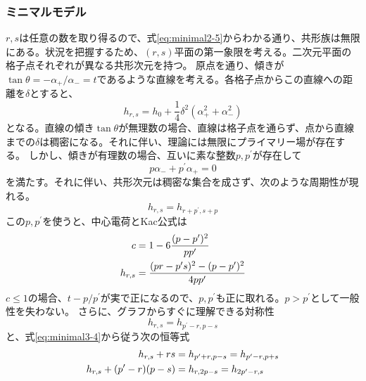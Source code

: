 \documentclass[11pt, aps, longbibliography]{article}
\numberwithin{equation}{section}
\begin{document}
        \subsubsection{ミニマルモデル}
        $r,s$は任意の数を取り得るので、式\eqref{eq:minimal2-5}からわかる通り、共形族は無限にある。状況を把握するため、$(r,s)$平面の第一象限を考える。二次元平面の格子点それぞれが異なる共形次元を持つ。
        原点を通り、傾きが$\tan \theta = -\alpha_+/\alpha_- = t$であるような直線を考える。各格子点からこの直線への距離を$\delta$とすると、
        \begin{equation}\label{eq:minimal3-1}
            h_{r,s} = h_0 + \frac{1}{4}\delta^2(\alpha_+^2 + \alpha_-^2)
        \end{equation}
        となる。直線の傾き$\tan \theta$が無理数の場合、直線は格子点を通らず、点から直線までの$\delta$は稠密になる。それに伴い、理論には無限にプライマリー場が存在する。
        しかし、傾きが有理数の場合、互いに素な整数$p,p^\prime$が存在して
        \begin{equation}\label{eq:minimal3-2}
            p\alpha_- + p^\prime \alpha_+ = 0
        \end{equation}
        を満たす。それに伴い、共形次元は稠密な集合を成さず、次のような周期性が現れる。
        \begin{equation}\label{eq:minimal3-3}
            h_{r,s} = h_{r+p^\prime, s+p}
        \end{equation}
        この$p,p^\prime$を使うと、中心電荷とKac公式は
        \begin{align}\label{eq:minimal3-4}
            c &= 1-6\frac{(p-p^\prime)^2}{pp^\prime} \\
            h_{r,s} &= \frac{(pr-p^\prime s)^2-(p-p^\prime)^2}{4pp^\prime} \notag 
        \end{align}
        $c\leq 1$の場合、$t-p/p^\prime$が実で正になるので、$p,p^\prime$も正に取れる。$p>p^\prime$として一般性を失わない。
        さらに、グラフからすぐに理解できる対称性
        \begin{equation}\label{eq:minimal3-5}
            h_{r,s} = h_{p^\prime-r,p-s}
        \end{equation}
        と、式\eqref{eq:minimal3-4}から従う次の恒等式
        \begin{align}\label{eq:minimal3-6}
            h_{r,s} + rs &= h_{p^\prime+r,p-s} = h_{p^\prime-r,p+s} \\
            h_{r,s} + (p^\prime -r)(p-s) &= h_{r,2p-s} = h_{2p^\prime-r,s} \notag 
        \end{align}
\end{document}
